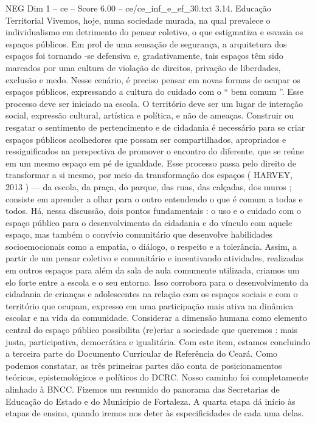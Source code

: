 \begin{textsample}{NEG Dim 1 – ce – Score 6.00 – ce/ce\_inf\_e\_ef\_30.txt}  \label{ex:f1_neg_244}
3.14.
Educação Territorial Vivemos, hoje, numa sociedade murada, na qual prevalece o individualismo em detrimento do pensar coletivo, o que estigmatiza e esvazia os espaços públicos.
Em prol de uma sensação de segurança, a arquitetura dos espaços foi tornando -se defensiva e, gradativamente, tais espaços têm sido marcados por uma cultura de violação de direitos, privação de liberdades, exclusão e medo.
Nesse cenário, é preciso pensar em novas formas de ocupar os espaços públicos, expressando a cultura do cuidado com o “ bem comum ”.
Esse processo deve ser iniciado na escola.
O território deve ser um lugar de interação social, expressão cultural, artística e política, e não de ameaças.
Construir ou resgatar o sentimento de pertencimento e de cidadania é necessário para se criar espaços públicos acolhedores que possam ser compartilhados, apropriados e ressignificados na perspectiva de promover o encontro do diferente, que se reúne em um mesmo espaço em pé de igualdade.
Esse processo passa pelo direito de transformar a si mesmo, por meio da transformação dos espaços ( HARVEY, 2013 ) — da escola, da praça, do parque, das ruas, das calçadas, dos muros ; consiste em aprender a olhar para o outro entendendo o que é comum a todas e todos.
Há, nessa discussão, dois pontos fundamentais : o uso e o cuidado com o espaço público para o desenvolvimento da cidadania e do vínculo com aquele espaço, mas também o convívio comunitário que desenvolve habilidades socioemocionais como a empatia, o diálogo, o respeito e a tolerância.
Assim, a partir de um pensar coletivo e comunitário e incentivando atividades, realizadas em outros espaços para além da sala de aula comumente utilizada, criamos um elo forte entre a escola e o seu entorno.
Isso corrobora para o desenvolvimento da cidadania de crianças e adolescentes na relação com os espaços sociais e com o território que ocupam, expresso em uma participação mais ativa na dinâmica escolar e na vida da comunidade.
Considerar a dimensão humana como elemento central do espaço público possibilita (re)criar a sociedade que queremos : mais justa, participativa, democrática e igualitária.
Com este item, estamos concluindo a terceira parte do Documento Curricular de Referência do Ceará.
Como podemos constatar, as três primeiras partes dão conta de posicionamentos teóricos, epistemológicos e políticos do DCRC.
Nosso caminho foi completamente alinhado à BNCC.
Fizemos um resumido do panorama das Secretarias de Educação do Estado e do Município de Fortaleza.
A quarta etapa dá início às etapas de ensino, quando iremos nos deter às especificidades de cada uma delas.

\end{textsample}
